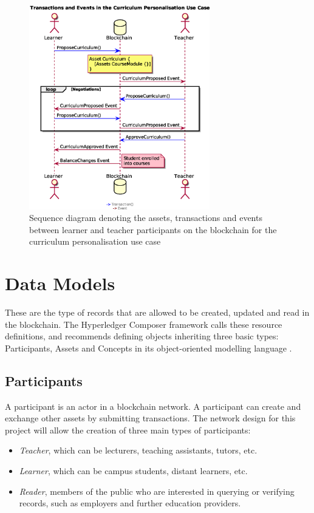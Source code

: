 \begin{figure}[!ht] 
    \centering    
    \includegraphics[width=0.7\textwidth]{personalisationloop}
    \caption[Curriculum Personalisation Use Case]
        {Sequence diagram denoting the assets, transactions and events between 
         learner and teacher participants on the blockchain for the curriculum personalisation use case} 
    \label{fig:personalisationloop}
\end{figure}



\section{Data Models}

These are the type of records that are allowed to be created, updated and read in the blockchain. 
The Hyperledger Composer framework calls these resource definitions, and recommends defining objects 
inheriting three basic types: Participants, Assets and Concepts in its object-oriented modelling language 
\citep{official2018composer}.

\subsection{Participants}

A participant is an actor in a blockchain network. A participant can create and exchange other assets 
by submitting transactions.
The network design for this project will allow the creation of three main types of participants: 
\begin{itemize}
    \setlength\itemsep{0em}    
    \item \textit{Teacher}, which can be lecturers, teaching assistants, tutors, etc.
    \item \textit{Learner}, which can be campus students, distant learners, etc.
    \item \textit{Reader}, members of the public who are interested in querying or verifying records, 
    such as employers and further education providers.
\end{itemize}

